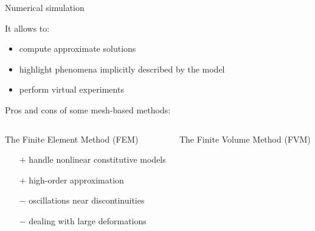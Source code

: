 
\begin{frame}{Numerical simulation}
  \begin{block}{It allows to:}
    \begin{itemize}
    \item compute approximate solutions
    \item highlight phenomena implicitly described by the model
    \item perform virtual experiments
    \end{itemize}
  \end{block}
  \begin{block}{Pros and cons of some mesh-based methods:}
    \begin{scriptsize}
      \begin{columns}
        \begin{column}{.45\textwidth}
          \begin{block}{\scriptsize The Finite Element Method (FEM)}
            \begin{itemize}
            \item[$+$] handle nonlinear constitutive models
            \item[$+$] high-order approximation
            \item[$-$] oscillations near discontinuities
            \item[$-$] dealing with large deformations
            \end{itemize}
          \end{block}
        \end{column}
        \begin{column}{.45\textwidth}
          \begin{block}{\scriptsize The Finite Volume Method (FVM)}
            \begin{itemize}

\end{itemize}
\end{block}
\end{column}
\end{columns}
\end{scriptsize}
\end{block}
\end{frame}
